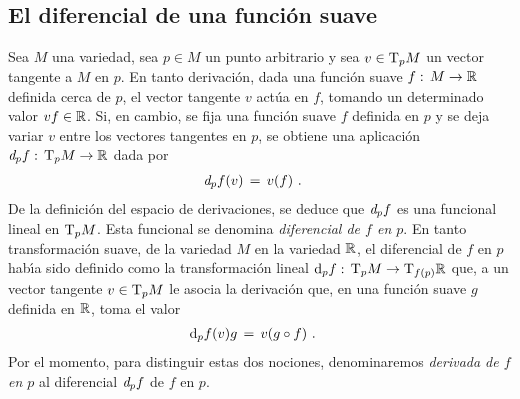 \subsection{El diferencial de una funci\'{o}n suave}
Sea $M$ una variedad, sea $p\in M$ un punto arbitrario y sea
$v\in\tangente[p]{M}$ un vector tangente a $M$ en $p$. En tanto derivaci\'{o}n,
dada una funci\'{o}n suave $f:\,M\rightarrow\bb{R}$ definida cerca de $p$,
el vector tangente $v$ act\'{u}a en $f$, tomando un determinado valor
$vf\in\bb{R}$. Si, en cambio, se fija una funci\'{o}n suave $f$ definida
en $p$ y se deja variar $v$ entre los vectores tangentes en $p$, se
obtiene una aplicaci\'{o}n $\derext[p]{f}:\,%
\tangente[p]{M}\rightarrow\bb{R}$ dada por
\begin{align*}
	\derext[p]{f}(v) & \,=\,v(f)
	\text{ .}
\end{align*}
%
De la definici\'{o}n del espacio de derivaciones, se deduce que
$\derext[p]{f}$ es una funcional lineal en $\tangente[p]{M}$. Esta
funcional se denomina \emph{diferencial de $f$ en $p$}. En tanto
transformaci\'{o}n suave, de la variedad $M$ en la variedad $\bb{R}$,
el diferencial de $f$ en $p$ hab\'{\i}a sido definido como la
transformaci\'{o}n lineal $\diferencial[p]{f}:\,%
\tangente[p]{M}\rightarrow\tangente[f(p)]{\bb{R}}$ que, a un vector
tangente $v\in\tangente[p]{M}$ le asocia la derivaci\'{o}n que, en
una funci\'{o}n suave $g$ definida en $\bb{R}$, toma el valor
\begin{align*}
	\diferencial[p]{f}(v)g & \,=\,v(g\circ f)
	\text{ .}
\end{align*}
%
Por el momento, para distinguir estas dos nociones, denominaremos
\emph{derivada de $f$ en $p$} al diferencial $\derext[p]{f}$ de $f$ en $p$.

